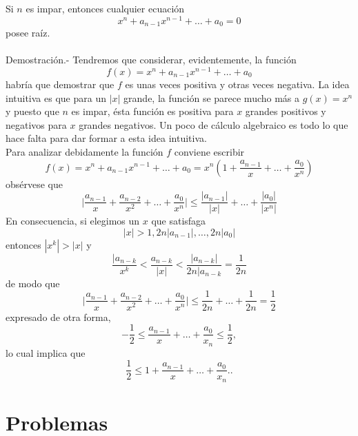 \begin{teo}
    Si $n$ es impar, entonces cualquier ecuación 
    $$x^n + a_{n-1}x^{n-1}+\ldots + a_0 = 0$$
    posee raíz.\\\\
	Demostración.-\; Tendremos que considerar, evidentemente, la función 
	$$f(x) = x^n + a_{n-1}x^{n-1} + \ldots + a_0$$
	habría que demostrar que $f$ es unas veces positiva y otras veces negativa. La idea intuitiva es que para un $|x|$ grande, la función se parece mucho más a $g(x)=x^n$ y puesto que $n$ es impar, ésta función es positiva para $x$ grandes positivos y negativos para $x$ grandes negativos. Un poco de cálculo algebraico es todo lo que hace falta para dar formar a esta idea intuitiva.\\
	Para analizar debidamente la función $f$ conviene escribir 
	$$f(x) = x^n + a_{n-1}x^{n-1}+\ldots + a_0 = x^n\left(1+\dfrac{a_{n-1}}{x} + \ldots + \dfrac{a_0}{x^n}\right)$$
	obsérvese que
	$$\bigg| \dfrac{a_{n-1}}{x} + \dfrac{a_{n-2}}{x^2} + \ldots + \dfrac{a_0}{x^n} \bigg|\leq \dfrac{|a_{n-1}|}{|x|} + \ldots + \dfrac{|a_0|}{|x^n|}$$
	En consecuencia, si elegimos un $x$ que satisfaga
	$$|x|>1,2n|a_{n-1}|,\ldots,2n|a_0|$$
	entonces $|x^k| > |x|$ y 
	$$\dfrac{|a_{n-k}}{x^k}<\dfrac{a_{n-k}}{|x|}<\dfrac{|a_{n-k}|}{2n|a_{n-k}}=\dfrac{1}{2n}$$
	de modo que 
	$$\bigg| \dfrac{a_{n-1}}{x} + \dfrac{a_{n-2}}{x^2} + \ldots + \dfrac{a_0}{x^n} \bigg|\leq \dfrac{1}{2n}+\ldots + \dfrac{1}{2n}=\dfrac{1}{2}$$
	expresado de otra forma,
	$$-\dfrac{1}{2}\leq \dfrac{a_{n-1}}{x}+\ldots + \dfrac{a_0}{x_n}\leq \dfrac{1}{2},$$
	lo cual implica que 
	$$\dfrac{1}{2}\leq 1 + \dfrac{a_{n-1}}{x}+\ldots + \dfrac{a_0}{x_n}..$$

\end{teo}





\section{Problemas}


